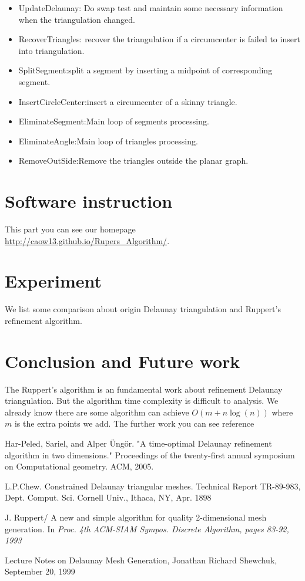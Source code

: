 \documentclass[letterpaper,12pt]{article}
\begin{document}
\begin{itemize}
\begin{itemize}
\item UpdateDelaunay: Do swap test and maintain some necessary information when the
triangulation changed.  
\item RecoverTriangles: recover the triangulation if a circumcenter is
failed to insert into triangulation.  
\item SplitSegment:split a segment by inserting a midpoint of corresponding segment.  
\item InsertCircleCenter:insert a circumcenter of a skinny triangle.  
\item EliminateSegment:Main loop of segments processing.  
\item EliminateAngle:Main loop of triangles processing.  
\item RemoveOutSide:Remove the triangles outside the planar graph.
\end{itemize}

\end{itemize}
\section{Software instruction}
\label{sec:03}
This part you can see our homepage \url{http://caow13.github.io/Rupers_Algorithm/}. 

\section{Experiment}
\label{sec:04}
We list some comparison about origin Delaunay triangulation and Ruppert's refinement algorithm. 



\section{Conclusion and Future work}
\label{sec:05}
The Ruppert's algorithm is an fundamental work about refinement Delaunay triangulation. But the
algorithm time complexity is difficult to analysis. We already know there are some algorithm can
achieve $O(m+n\log(n))$ where $m$ is the extra points we add. The further work you can see reference
\cite{Optimal} 


\begin{thebibliography}{99}

 Har-Peled, Sariel, and Alper \"{U}ng\"{o}r. "A time-optimal Delaunay refinement
algorithm in two dimensions."  Proceedings of the twenty-first annual symposium on Computational
geometry. ACM, 2005.

 L.P.Chew. Constrained Delaunay triangular meshes. Technical Report TR-89-983,
Dept. Comput. Sci. Cornell Univ., Ithaca, NY, Apr. 1898

 J. Ruppert/ A new and simple algorithm for quality 2-dimensional mesh
generation. In \emph{Proc. 4th ACM-SIAM Sympos. Discrete Algorithm, pages 83-92, 1993}

 Lecture Notes on Delaunay Mesh Generation, Jonathan Richard Shewchuk, September
20, 1999


\end{thebibliography}
\end{document}
